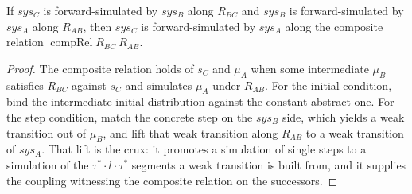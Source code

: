 \begin{theorem}
  \label{thm:forward-trans}
  \leanok
  If $sys_C$ is forward-simulated by $sys_B$ along $R_{BC}$ and $sys_B$ is forward-simulated by $sys_A$ along $R_{AB}$, then $sys_C$ is forward-simulated by $sys_A$ along the composite relation $\operatorname{compRel} R_{BC}\ R_{AB}$.
\end{theorem}

\begin{proof}\leanok
  The composite relation holds of $s_C$ and $\mu_A$ when some intermediate $\mu_B$ satisfies $R_{BC}$ against $s_C$ and simulates $\mu_A$ under $R_{AB}$.
  For the initial condition, bind the intermediate initial distribution against the constant abstract one.
  For the step condition, match the concrete step on the $sys_B$ side, which yields a weak transition out of $\mu_B$, and lift that weak transition along $R_{AB}$ to a weak transition of $sys_A$.
  That lift is the crux: it promotes a simulation of single steps to a simulation of the $\tau^\ast \cdot l \cdot \tau^\ast$ segments a weak transition is built from, and it supplies the coupling witnessing the composite relation on the successors.
\end{proof}
